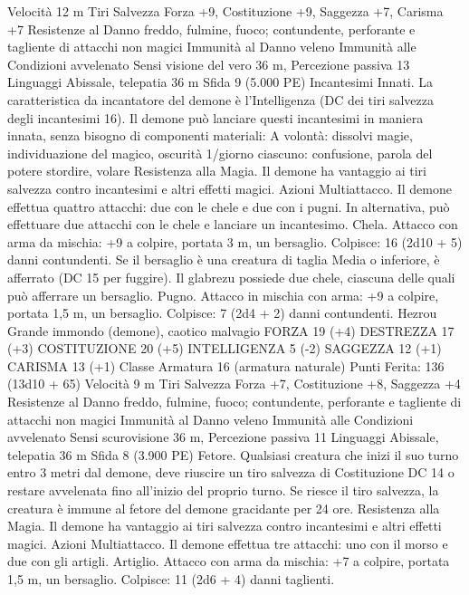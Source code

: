 \begin{multicols}{2}
Velocità 12 m
Tiri Salvezza Forza +9, Costituzione +9, Saggezza +7, Carisma
+7
Resistenze al Danno freddo, fulmine, fuoco; contundente,
perforante e tagliente di attacchi non magici
Immunità al Danno veleno
Immunità alle Condizioni avvelenato
Sensi visione del vero 36 m, Percezione passiva 13
Linguaggi Abissale, telepatia 36 m
Sfida 9 (5.000 PE)
Incantesimi Innati. La caratteristica da incantatore del demone è
l’Intelligenza (DC dei tiri salvezza degli incantesimi 16). Il
demone può lanciare questi incantesimi in maniera innata, senza
bisogno di componenti materiali:
A volontà: dissolvi magie, individuazione del magico, oscurità
1/giorno ciascuno: confusione, parola del potere stordire, volare
Resistenza alla Magia. Il demone ha vantaggio ai tiri salvezza
contro incantesimi e altri effetti magici.
Azioni
Multiattacco. Il demone effettua quattro attacchi: due con le
chele e due con i pugni. In alternativa, può effettuare due attacchi
con le chele e lanciare un incantesimo.
Chela. Attacco con arma da mischia: +9 a colpire, portata 3 m,
un bersaglio.
Colpisce: 16 (2d10 + 5) danni contundenti. Se il bersaglio è una
creatura di taglia Media o inferiore, è afferrato (DC 15 per
fuggire). Il glabrezu possiede due chele, ciascuna delle quali può
afferrare un bersaglio.
Pugno. Attacco in mischia con arma: +9 a colpire, portata 1,5 m,
un bersaglio.
Colpisce: 7 (2d4 + 2) danni contundenti.
Hezrou
Grande immondo (demone), caotico malvagio
FORZA 19 (+4)
DESTREZZA 17 (+3)
COSTITUZIONE 20 (+5)
INTELLIGENZA 5 (-2)
SAGGEZZA 12 (+1)
CARISMA 13 (+1)
Classe Armatura 16 (armatura naturale)
\hspace*{0pt}\hfill{Punti Ferita}: 136 (13d10 + 65)
Velocità 9 m
Tiri Salvezza Forza +7, Costituzione +8, Saggezza +4
Resistenze al Danno freddo, fulmine, fuoco; contundente,
perforante e tagliente di attacchi non magici
Immunità al Danno veleno
Immunità alle Condizioni avvelenato
Sensi scurovisione 36 m, Percezione passiva 11
Linguaggi Abissale, telepatia 36 m
Sfida 8 (3.900 PE)
Fetore. Qualsiasi creatura che inizi il suo turno entro 3 metri dal
demone, deve riuscire un tiro salvezza di Costituzione DC 14 o
restare avvelenata fino all’inizio del proprio turno. Se riesce il
tiro salvezza, la creatura è immune al fetore del demone
gracidante per 24 ore.
Resistenza alla Magia. Il demone ha vantaggio ai tiri salvezza
contro incantesimi e altri effetti magici.
Azioni
Multiattacco. Il demone effettua tre attacchi: uno con il morso e
due con gli artigli.
Artiglio. Attacco con arma da mischia: +7 a colpire, portata 1,5
m, un bersaglio.
Colpisce: 11 (2d6 + 4) danni taglienti.

\end{multicols}
